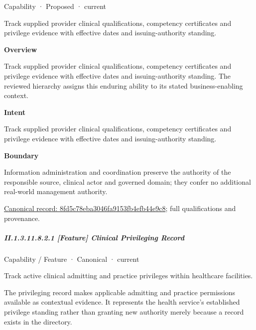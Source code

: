 \label{element:8fd5c78eba3046fa9153fb4efb44e9c8}
{\small Capability · Proposed · current}\par

Track supplied provider clinical qualifications, competency certificates and privilege evidence with effective dates and issuing-authority standing.



\textbf{Overview}



Track supplied provider clinical qualifications, competency certificates and privilege evidence with effective dates and issuing-authority standing. The reviewed hierarchy assigns this enduring ability to its stated business-enabling context.



\textbf{Intent}



Track supplied provider clinical qualifications, competency certificates and privilege evidence with effective dates and issuing-authority standing.



\textbf{Boundary}



Information administration and coordination preserve the authority of the responsible source, clinical actor and governed domain; they confer no additional real-world management authority.


{\footnotesize \href{../../../../continuum/strategy/capability/8fd5c78eba3046fa9153fb4efb44e9c8.md}{Canonical record: 8fd5c78eba3046fa9153fb4efb44e9c8}; full qualifications and provenance.}\par
\subparagraph*{II.1.3.11.8.2.1 [Feature] Clinical Privileging Record}
\label{navigation:II.1.3.11.8.2.1}

\label{element:5073df3c6bb94c218ca19b74550b19fa}
{\small Capability / Feature · Canonical · current}\par

Track active clinical admitting and practice privileges within healthcare facilities.



The privileging record makes applicable admitting and practice permissions available as contextual evidence. It represents the health service's established privilege standing rather than granting new authority merely because a record exists in the directory.


